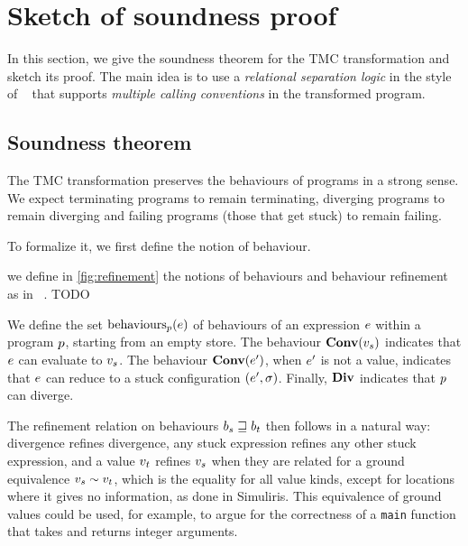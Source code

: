 \section{Sketch of soundness proof}
\label{sec:sketch}

In this section, we give the soundness theorem for the \DataLang TMC transformation and sketch its proof.
The main idea is to use a \emph{relational separation logic} in the style of \Simuliris~\cite{DBLP:journals/pacmpl/GaherSSJDKKD22} that supports \emph{multiple calling conventions} in the transformed program.

\subsection{Soundness theorem}

The TMC transformation preserves the behaviours of programs in a strong sense.
We expect terminating programs to remain terminating, diverging programs to remain diverging and failing programs (those that get stuck) to remain failing.

To formalize it, we first define the notion of behaviour.

we define in \cref{fig:refinement} the notions of behaviours and behaviour refinement as in \Simuliris~\cite{DBLP:journals/pacmpl/GaherSSJDKKD22}.
TODO

We define the set $\mathrm{behaviours}_{\datalangProg} (\datalangExpr)$ of behaviours of an expression $\datalangExpr$ within a program $\datalangProg$, starting from an empty store.
The behaviour $\constr{Conv}(\datalangVal_s)$ indicates that $\datalangExpr$ can evaluate to $\datalangVal_s$.
The behaviour $\constr{Conv}(\datalangExpr')$, when $\datalangExpr'$ is not a value, indicates that $\datalangExpr$ can reduce to a stuck configuration $(\datalangExpr', \datalangState)$.
Finally, $\constr{Div}$ indicates that $\datalangProg$ can diverge.

The refinement relation on behaviours $b_s \sqsupseteq b_t$ then follows in a natural way: divergence refines divergence, any stuck expression refines any other stuck expression, and a value $\datalangVal_t$ refines $\datalangVal_s$ when they are related for a ground equivalence $\datalangVal_s \similar \datalangVal_t$, which is the equality for all value kinds, except for locations where it gives no information, as done in Simuliris.
This equivalence of ground values could be used, for example, to argue for the correctness of a \texttt{main} function that takes and returns integer arguments.

